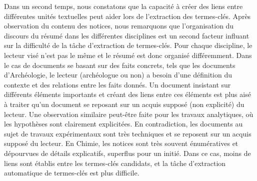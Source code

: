   Dans un second temps, nous constatons que la capacité à créer des liens entre
  différentes unités textuelles peut aider lors de l'extraction des termes-clés.
  Après observation du contenu des notices, nous remarquons que l'organisation
  du discours du résumé dans les différentes disciplines est un second facteur
  influant sur la difficulté de la tâche d'extraction de termes-clés. Pour
  chaque discipline, le lecteur visé n'est pas le même et le résumé est donc
  organisé différemment. Dans le cas de documents se basant sur des faits
  concrets, tels que les documents d'Archéologie, le lecteur (archéologue ou
  non) a besoin d'une définition du contexte et des relations entre les faits
  donnés. Un document insistant sur différents éléments importants et créant des
  liens entre ces éléments est plus aisé à traiter qu'un document se reposant
  sur un acquis supposé (non explicité) du lecteur. Une observation similaire
  peut-être faite pour les travaux analytiques, où les hypothèses sont
  clairement explicitées. En contradiction, les documents au sujet de travaux
  expérimentaux sont très techniques et se reposent sur un acquis supposé du
  lecteur. En Chimie, les notices sont très souvent énumératives et dépourvues
  de détails explicatifs, superflus pour un initié. Dans ce cas, moins de liens
  sont établis entre les termes-clés candidats, et la tâche d'extraction
  automatique de termes-clés est plus difficile.

